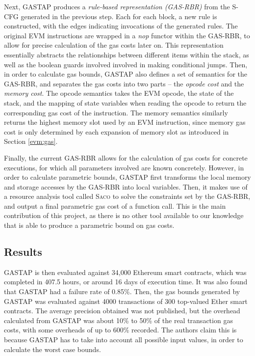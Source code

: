 Next, GASTAP produces a \textit{rule-based representation (GAS-RBR)} from the S-CFG generated in the previous step.
Each for each block, a new rule is constructed, with the edges indicating invocations of the generated
rules. The original EVM instructions are wrapped in a \textit{nop} functor within the GAS-RBR, to
allow for precise calculation of the gas costs later on. This representation essentially abstracts
the relationships between different items within the stack, as well as the boolean guards involved
involved in making conditional jumps. Then, in order to calculate gas bounds, GASTAP also defines 
a set of semantics for the GAS-RBR, and separates the gas costs into two parts -- the \textit{opcode cost}
and the \textit{memory cost}. The opcode semantics takes the EVM opcode, the state of the stack, and
the mapping of state variables when reading the opcode to return the corresponding gas cost 
of the instruction. The memory semantics similarly returns the highest memory slot used 
by an EVM instruction, since memory gas cost is only determined by each expansion of memory slot
as introduced in Section \ref{evm:gas}.

Finally, the current GAS-RBR allows for the calculation of gas costs for concrete executions,
for which all parameters involved are known concretely. However, in order to calculate parametric
bounds, GASTAP first transforms the local memory and storage accesses by the GAS-RBR into local variables.
Then, it makes use of a resource analysis tool called \textsc{Saco} to solve the constraints set by the GAS-RBR,
and output a final parametric gas cost of a function call. This is the main contribution of this project,
as there is no other tool available to our knowledge that is able to produce a parametric bound on gas costs.

\subsection{Results}

GASTAP is then evaluated against 34,000 Ethereum smart contracts, which was completed in 407.5 hours, or around 16
days of execution time. It was also found that GASTAP had a failure rate of 0.85\%. Then, the gas bounds
generated by GASTAP was evaluated against 4000 transactions of 300 top-valued Ether smart contracts.
The average precision obtained was not published, but the overhead calculated from GASTAP was about
10\% to 50\% of the real transaction gas costs, with some overheads of up to 600\% recorded. 
The authors claim this is because GASTAP has to take into account all possible input values, in order
to calculate the worst case bounds.

